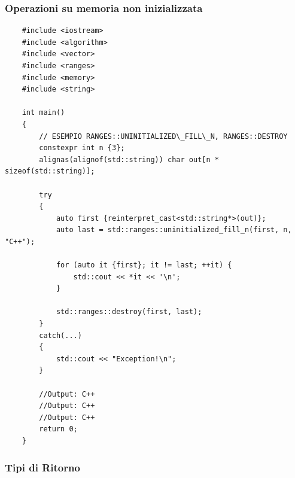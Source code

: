 \subsubsection{Operazioni su memoria non inizializzata}

\begin{lstlisting}
	#include <iostream>
	#include <algorithm>
	#include <vector>
	#include <ranges>
	#include <memory>
	#include <string>
	
	int main()
	{
		// ESEMPIO RANGES::UNINITIALIZED\_FILL\_N, RANGES::DESTROY
		constexpr int n {3};
		alignas(alignof(std::string)) char out[n * sizeof(std::string)];
		
		try
		{
			auto first {reinterpret_cast<std::string*>(out)};
			auto last = std::ranges::uninitialized_fill_n(first, n, "C++");
			
			for (auto it {first}; it != last; ++it) {
				std::cout << *it << '\n';
			}
			
			std::ranges::destroy(first, last);
		}
		catch(...)
		{
			std::cout << "Exception!\n";
		}
		
		//Output: C++
		//Output: C++
		//Output: C++
		return 0;
	}
\end{lstlisting}

\subsubsection{Tipi di Ritorno}

